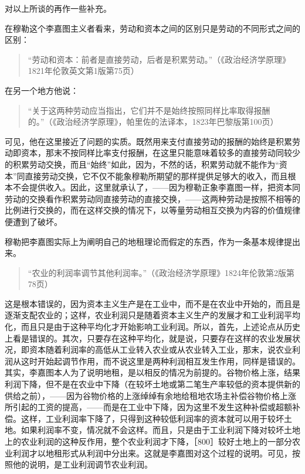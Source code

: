 
对以上所谈的再作一些补充。

在穆勒这个李嘉图主义者看来，劳动和资本之间的区别只是劳动的不同形式之间的区别：

\begin{quote}{“劳动和资本：前者是直接劳动，后者是积累劳动。”（《政治经济学原理》1821年伦敦英文第1版第75页）}\end{quote}

在另一个地方他说：

\begin{quote}{“关于这两种劳动应当指出，它们并不是始终按照同样比率取得报酬的。”（《政治经济学原理》，帕里佐的法译本，1823年巴黎版第100页）}\end{quote}

可见，他在这里接近了问题的实质。既然用来支付直接劳动的报酬的始终是积累劳动即资本，那末不按同样比率支付报酬，在这里只能意味着较多的直接劳动同较少的积累劳动交换，而且“始终”如此，因为，不然的话，积累劳动就不能作为“资本”同直接劳动交换，它不仅不能象穆勒所期望的那样提供足够大的收入，而且根本不会提供收入。因此，这里就承认了，——因为穆勒正象李嘉图一样，把资本同劳动的交换看作积累劳动同直接劳动的直接交换，——这两种劳动是按照不相等的比例进行交换的，而在这样交换的情况下，以等量劳动相互交换为内容的价值规律便遭到了破坏。


穆勒把李嘉图实际上为阐明自己的地租理论而假定的东西，作为一条基本规律提出来。

\begin{quote}{“农业的利润率调节其他利润率。”（《政治经济学原理》1824年伦敦第2版第78页）}\end{quote}

这是根本错误的，因为资本主义生产是在工业中，而不是在农业中开始的，而且是逐渐支配农业的；这样，农业利润只是随着资本主义生产的发展才和工业利润平均化，而且只是由于这种平均化才开始影响工业利润。所以，首先，上述论点从历史上看是错误的。其次，只要存在这种平均化，就是说，只要存在这样的农业发展状况，即资本随着利润率的高低从工业转入农业或从农业转入工业，那末，说农业利润从这时开始起调节作用，而不说这里是两种利润相互发生作用，同样是错误的。其实，李嘉图本人为了说明地租，是以相反的情况为前提的。谷物价格上涨，结果利润下降，但不是在农业中下降（在较坏土地或第二笔生产率较低的资本提供新的供给之前），——因为谷物价格的上涨绰绰有余地给租地农场主补偿谷物价格上涨所引起的工资的提高，——而是在工业中下降，因为这里不发生这种补偿或超额补偿。这样，工业利润率下降了，只得到这种较低利润率的资本就可以用于较坏土地。如果利润率不变，情况就不会这样。而且，只是由于工业利润下降对较坏土地上的农业利润的这种反作用，整个农业利润才下降，［800］较好土地上的一部分农业利润才以地租形式从利润中分出来。这就是李嘉图对这个过程的说明。可见，按照他的说明，是工业利润调节农业利润。

